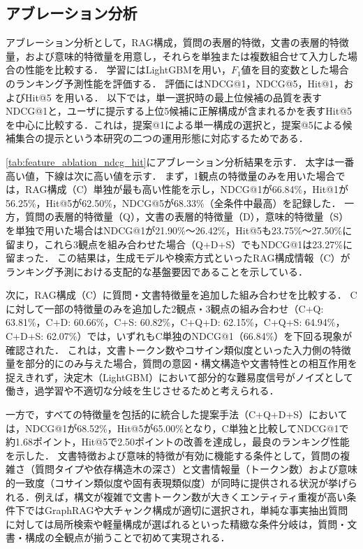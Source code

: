 \subsection{アブレーション分析} \label{sec5.5}
アブレーション分析として，RAG構成，質問の表層的特徴，文書の表層的特徴量，および意味的特徴量を用意し，それらを単独または複数組合せて入力した場合の性能を比較する．
学習にはLightGBMを用い，$F_1$値を目的変数とした場合のランキング予測性能を評価する．
評価にはNDCG@1，NDCG@5，Hit@1，およびHit@5 を用いる．
以下では，単一選択時の最上位候補の品質を表すNDCG@1と，ユーザに提示する上位5候補に正解構成が含まれるかを表すHit@5を中心に比較する．これは，提案@1による単一構成の選択と，提案@5による候補集合の提示という本研究の二つの運用形態に対応するためである．

\ref{tab:feature_ablation_ndcg_hit}にアブレーション分析結果を示す．
太字は一番高い値，下線は次に高い値を示す．
まず，1観点の特徴量のみを用いた場合では，RAG構成（C）単独が最も高い性能を示し，NDCG@1が66.84\%，Hit@1が56.25\%，Hit@5が62.50\%，NDCG@5が68.33\%（全条件中最高）を記録した．
一方，質問の表層的特徴量（Q），文書の表層的特徴量（D），意味的特徴量（S）を単独で用いた場合はNDCG@1が21.90\%～26.42\%，Hit@5も23.75\%～27.50\%に留まり，これら3観点を組み合わせた場合（Q+D+S）でもNDCG@1は23.27\%に留まった．
この結果は，生成モデルや検索方式といったRAG構成情報（C）がランキング予測における支配的な基盤要因であることを示している．

次に，RAG構成（C）に質問・文書特徴量を追加した組み合わせを比較する．
Cに対して一部の特徴量のみを追加した2観点・3観点の組み合わせ（C+Q: 63.81\%，C+D: 60.66\%，C+S: 60.82\%，C+Q+D: 62.15\%，C+Q+S: 64.94\%，C+D+S: 62.07\%）では，いずれもC単独のNDCG@1（66.84\%）を下回る現象が確認された．
これは，文書トークン数やコサイン類似度といった入力側の特徴量を部分的にのみ与えた場合，質問の意図・構文構造や文書特性との相互作用を捉えきれず，決定木（LightGBM）において部分的な難易度信号がノイズとして働き，過学習や不適切な分岐を生じさせるためと考えられる．

一方で，すべての特徴量を包括的に統合した提案手法（C+Q+D+S）においては，NDCG@1が68.52\%，Hit@5が65.00\%となり，C単独と比較してNDCG@1で約1.68ポイント，Hit@5で2.50ポイントの改善を達成し，最良のランキング性能を示した．
文書特徴および意味的特徴が有効に機能する条件として，質問の複雑さ（質問タイプや依存構造木の深さ）と文書情報量（トークン数）および意味的一致度（コサイン類似度や固有表現類似度）が同時に提供される状況が挙げられる．例えば，構文が複雑で文書トークン数が大きくエンティティ重複が高い条件下ではGraphRAGや大チャンク構成が適切に選択され，単純な事実抽出質問に対しては局所検索や軽量構成が選ばれるといった精緻な条件分岐は，質問・文書・構成の全観点が揃うことで初めて実現される．

